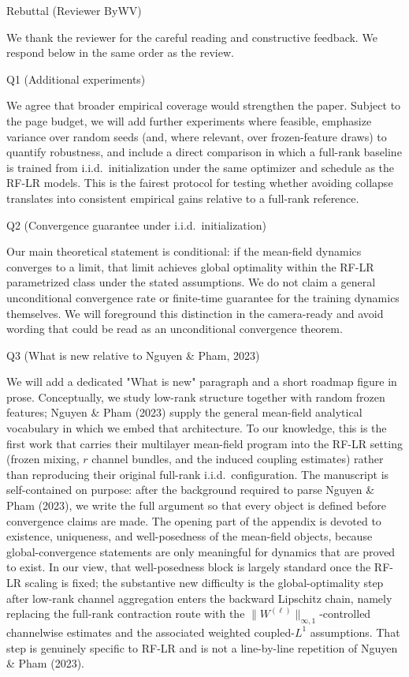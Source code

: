 Rebuttal (Reviewer ByWV)

We thank the reviewer for the careful reading and constructive feedback. We respond below in the same order as the review.

Q1 (Additional experiments)

We agree that broader empirical coverage would strengthen the paper. Subject to the page budget, we will add further experiments where feasible, emphasize variance over random seeds (and, where relevant, over frozen-feature draws) to quantify robustness, and include a direct comparison in which a full-rank baseline is trained from i.i.d.\ initialization under the same optimizer and schedule as the RF-LR models. This is the fairest protocol for testing whether avoiding collapse translates into consistent empirical gains relative to a full-rank reference.

Q2 (Convergence guarantee under i.i.d.\ initialization)

Our main theoretical statement is conditional: if the mean-field dynamics converges to a limit, that limit achieves global optimality within the RF-LR parametrized class under the stated assumptions. We do not claim a general unconditional convergence rate or finite-time guarantee for the training dynamics themselves. We will foreground this distinction in the camera-ready and avoid wording that could be read as an unconditional convergence theorem.

Q3 (What is new relative to Nguyen \& Pham, 2023)

We will add a dedicated "What is new" paragraph and a short roadmap figure in prose. Conceptually, we study low-rank structure together with random frozen features; Nguyen \& Pham (2023) supply the general mean-field analytical vocabulary in which we embed that architecture. To our knowledge, this is the first work that carries their multilayer mean-field program into the RF-LR setting (frozen mixing, $r$ channel bundles, and the induced coupling estimates) rather than reproducing their original full-rank i.i.d.\ configuration. The manuscript is self-contained on purpose: after the background required to parse Nguyen \& Pham (2023), we write the full argument so that every object is defined before convergence claims are made. The opening part of the appendix is devoted to existence, uniqueness, and well-posedness of the mean-field objects, because global-convergence statements are only meaningful for dynamics that are proved to exist. In our view, that well-posedness block is largely standard once the RF-LR scaling is fixed; the substantive new difficulty is the global-optimality step after low-rank channel aggregation enters the backward Lipschitz chain, namely replacing the full-rank contraction route with the $\|W^{(\ell)}\|_{\infty,1}$-controlled channelwise estimates and the associated weighted coupled-$L^1$ assumptions. That step is genuinely specific to RF-LR and is not a line-by-line repetition of Nguyen \& Pham (2023).

